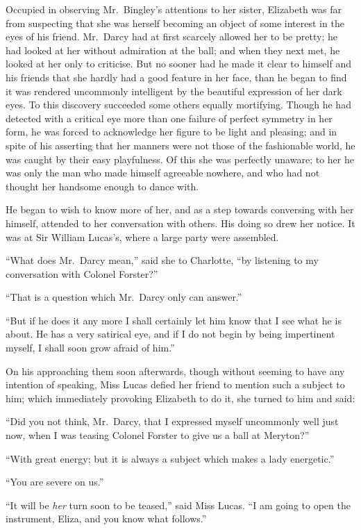\documentclass[12pt,english,oneside]{book}
\begin{document}
Occupied in observing Mr.\ Bingley's attentions to her sister, Elizabeth
was far from suspecting that she was herself becoming an object of
some interest in the eyes of his friend. Mr.\ Darcy had at first
scarcely allowed her to be pretty; he had looked at her without admiration
at the ball; and when they next met, he looked at her only to criticise.
But no sooner had he made it clear to himself and his friends that
she hardly had a good feature in her face, than he began to find it
was rendered uncommonly intelligent by the beautiful expression of
her dark eyes. To this discovery succeeded some others equally mortifying.
Though he had detected with a critical eye more than one failure of
perfect symmetry in her form, he was forced to acknowledge her figure
to be light and pleasing; and in spite of his asserting that her manners
were not those of the fashionable world, he was caught by their easy
playfulness. Of this she was perfectly unaware; to her he was only
the man who made himself agreeable nowhere, and who had not thought
her handsome enough to dance with.

He began to wish to know more of her, and as a step towards conversing
with her himself, attended to her conversation with others. His doing
so drew her notice. It was at Sir William Lucas's, where a large party
were assembled.

{}``What does Mr.\ Darcy mean,'' said she to Charlotte, {}``by
listening to my conversation with Colonel Forster?''\ 

{}``That is a question which Mr.\ Darcy only can answer.''

{}``But if he does it any more I shall certainly let him know that
I see what he is about. He has a very satirical eye, and if I do not
begin by being impertinent myself, I shall soon grow afraid of him.''

On his approaching them soon afterwards, though without seeming to
have any intention of speaking, Miss Lucas defied her friend to mention
such a subject to him; which immediately provoking Elizabeth to do
it, she turned to him and said:

{}``Did you not think, Mr.\ Darcy, that I expressed myself uncommonly
well just now, when I was teasing Colonel Forster to give us a ball
at Meryton?''\ 

{}``With great energy; but it is always a subject which makes a lady
energetic.''

{}``You are severe on us.''

{}``It will be \textit{her} turn soon to be teased,'' said Miss
Lucas. {}``I am going to open the instrument, Eliza, and you know
what follows.''
\end{document}

